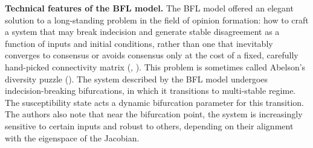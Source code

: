 \documentclass[]{article}
\begin{document}
\textbf{Technical features of the BFL model.} The BFL model offered an elegant solution to a long-standing problem in the field of opinion formation: how to craft a system that may break indecision and generate stable disagreement as a function of inputs and initial conditions, rather than one that inevitably converges to consensus or avoids consensus only at the cost of a fixed, carefully hand-picked connectivity matrix (\cite{ravazziDynamicalSocialNetworks2021}, \cite{bernardoBoundedConfidenceOpinion2024}). This problem is sometimes called Abelson's diversity puzzle (\cite{abelsonMathematicalModelsDistribution1964}). The system described by the BFL model undergoes indecision-breaking bifurcations, in which it transitions to multi-stable regime. The susceptibility state acts a dynamic bifurcation parameter for this transition. The authors also note that near the bifurcation point, the system is increasingly sensitive to certain inputs and robust to others, depending on their alignment with the eigenspace of the Jacobian.
\end{document}
